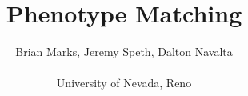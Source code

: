 \documentclass{sig-alternate}
\begin{document}
\title{Phenotype Matching}
\author{Brian Marks, Jeremy Speth, Dalton Navalta \\\\ University of Nevada, Reno}
\date{}

\maketitle
\begin{abstract}
 
\end{abstract}

\category{}{}{}


\terms{}

\keywords{}

\section{}


\section{}


\subsection{}


	





	
\end{document}
